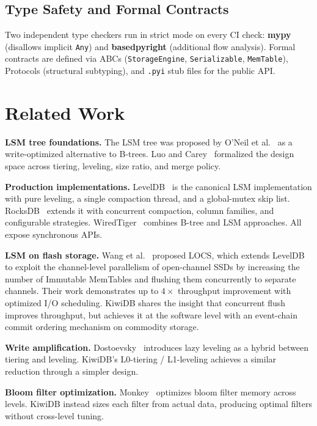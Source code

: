 \documentclass[conference]{IEEEtran}
\begin{document}
\subsection{Type Safety and Formal Contracts}

Two independent type checkers run in strict mode on every CI check: \textbf{mypy} (disallows implicit \texttt{Any}) and \textbf{basedpyright} (additional flow analysis). Formal contracts are defined via ABCs (\texttt{StorageEngine}, \texttt{Serializable}, \texttt{MemTable}), Protocols (structural subtyping), and \texttt{.pyi} stub files for the public API.

\section{Related Work}
\label{sec:related}

\textbf{LSM tree foundations.} The LSM tree was proposed by O'Neil et al.~\cite{oneil1996} as a write-optimized alternative to B-trees. Luo and Carey~\cite{luo2020} formalized the design space across tiering, leveling, size ratio, and merge policy.

\textbf{Production implementations.} LevelDB~\cite{leveldb} is the canonical LSM implementation with pure leveling, a single compaction thread, and a global-mutex skip list. RocksDB~\cite{rocksdb} extends it with concurrent compaction, column families, and configurable strategies. WiredTiger~\cite{wiredtiger} combines B-tree and LSM approaches. All expose synchronous APIs.

\textbf{LSM on flash storage.} Wang et al.~\cite{wang2014locs} proposed LOCS, which extends LevelDB to exploit the channel-level parallelism of open-channel SSDs by increasing the number of Immutable MemTables and flushing them concurrently to separate channels. Their work demonstrates up to $4\times$ throughput improvement with optimized I/O scheduling. KiwiDB shares the insight that concurrent flush improves throughput, but achieves it at the software level with an event-chain commit ordering mechanism on commodity storage.

\textbf{Write amplification.} Dostoevsky~\cite{dayan2018} introduces lazy leveling as a hybrid between tiering and leveling. KiwiDB's L0-tiering / L1-leveling achieves a similar reduction through a simpler design.

\textbf{Bloom filter optimization.} Monkey~\cite{dayan2017} optimizes bloom filter memory across levels. KiwiDB instead sizes each filter from actual data, producing optimal filters without cross-level tuning.
\end{document}
